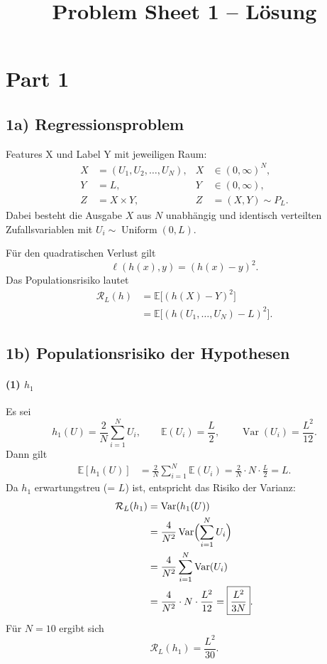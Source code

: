 \documentclass[11pt,a4paper]{article}
\title{Problem Sheet 1 -- Lösung}
\date{}
\newcommand{\E}{\mathbb{E}}
\newcommand{\Var}{\operatorname{Var}}
\newcommand{\Unif}{\operatorname{Uniform}}
\newcommand{\Risk}{\mathcal{R}}
\begin{document}
\maketitle

\section*{Part 1}
\subsection*{1a) Regressionsproblem}
Features X und Label Y mit jeweiligen Raum:
\begin{align*}
 X&=(U_1,U_2,\ldots,U_N), & X&\in(0,\infty)^N,\\
 Y&=L, &Y&\in(0,\infty),\\
 Z&=X\times Y, & Z&=(X,Y)\sim P_L.
\end{align*}
Dabei besteht die Ausgabe $X$ aus $N$ unabhängig und identisch verteilten
Zufallsvariablen mit $U_i\sim\Unif(0,L)$.

Für den quadratischen Verlust gilt
\[
 \ell(h(x),y)=(h(x)-y)^2.
\]
Das Populationsrisiko lautet
\begin{align*}
 \Risk_L(h)
 &=\E\bigl[(h(X)-Y)^2\bigr]\\
 &=\E\bigl[(h(U_1,\ldots,U_N)-L)^2\bigr].
\end{align*}

\subsection*{1b) Populationsrisiko der Hypothesen}
\paragraph{(1) $h_1$}
Es sei
\[
 h_1(U)=\frac{2}{N}\sum_{i=1}^{N}U_i,
 \qquad \E(U_i)=\frac L2,
 \qquad \Var(U_i)=\frac{L^2}{12}.
\]
Dann gilt
\begin{align*}
 \E[h_1(U)]
 &=\frac{2}{N}\sum_{i=1}^{N}\E(U_i)
 =\frac{2}{N}\cdot N\cdot\frac L2=L.
\end{align*}
Da $h_1$ erwartungstreu (= $L$) ist, entspricht das Risiko der Varianz:
\begin{align*}
 \Risk_L(h_1)
 &=\Var(h_1(U))\\
 &=\frac{4}{N^2}\Var\Bigl(\sum_{i=1}^{N}U_i\Bigr)\\
 &=\frac{4}{N^2}\sum_{i=1}^{N}\Var(U_i)\\
 &=\frac{4}{N^2}\cdot N\cdot\frac{L^2}{12}
 =\boxed{\frac{L^2}{3N}}.
\end{align*}
Für $N=10$ ergibt sich
\[
 \boxed{\Risk_L(h_1)=\frac{L^2}{30}}.
\]
\end{document}
